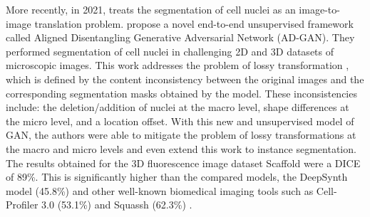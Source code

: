 More recently, in 2021, \cite{adgan} treats the segmentation of cell nuclei as an image-to-image translation problem. \citet{adgan} propose a novel end-to-end unsupervised framework called Aligned Disentangling Generative Adversarial Network (AD-GAN). They performed segmentation of cell nuclei in challenging \ac{2D} and \ac{3D} datasets of microscopic images. This work addresses the problem of lossy transformation \cite{lossy:cyclegan}, which is defined by the content inconsistency between the original images and the corresponding segmentation masks obtained by the model. These inconsistencies include: the deletion/addition of nuclei at the macro level, shape differences at the micro level, and a location offset. With this new and unsupervised model of \ac{GAN}, the authors were able to mitigate the problem of lossy transformations at the macro and micro levels and even extend this work to instance segmentation. The results obtained for the \ac{3D} fluorescence image dataset Scaffold \cite{dataset} were a DICE of 89\%. This is significantly higher than the compared models, the DeepSynth model \cite{deepsynth} (45.8\%) and other well-known biomedical imaging tools such as Cell-Profiler 3.0 \cite{cellprofiler} (53.1\%) and Squassh (62.3\%) \cite{squassh}.


